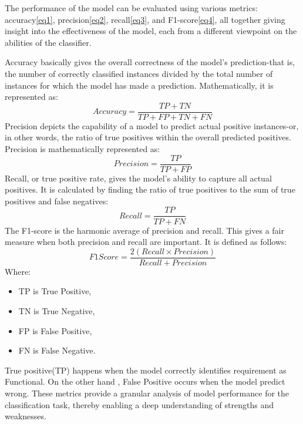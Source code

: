 \documentclass[conference]{IEEEtran} %
\begin{document}
The performance of the model can be evaluated using various metrics: accuracy\ref{eq1}, precision\ref{eq2}, recall\ref{eq3}, and F1-score\ref{eq4}, all together giving insight into the effectiveness of the model, each from a different viewpoint on the abilities of the classifier. 

Accuracy basically gives the overall correctness of the model's prediction-that is, the number of correctly classified instances divided by the total number of instances for which the model has made a prediction. Mathematically, it is represented as: 
\begin{equation}
    Accuracy =\frac{TP+TN}{TP+FP+TN+FN}
    \label{eq1}
\end{equation}
Precision depicts the capability of a model to predict actual positive instances-or, in other words, the ratio of true positives within the overall predicted positives. Precision is mathematically represented as: 
\begin{equation}
    Precision =\frac{TP}{TP+FP}
    \label{eq3}
\end{equation}
Recall, or true positive rate, gives the model's ability to capture all actual positives. It is calculated by finding the ratio of true positives to the sum of true positives and false negatives:  
\begin{equation}
    Recall =\frac{TP}{TP+FN}
    \label{eq2}
\end{equation}
The F1-score is the harmonic average of precision and recall. This gives a fair measure when both precision and recall are important. It is defined as follows:  
\begin{equation}
    F1 Score =\frac{2(Recall \times Precision)}{Recall+Precision}
    \label{eq4}
\end{equation}
Where: 
\begin{itemize}
    \item TP is True Positive,
    \item TN is True Negative,
    \item FP is False Positive,
    \item FN is False Negative.
\end{itemize}
True positive(TP) happens when the model correctly identifies requirement as Functional.
On the other hand , False Positive occurs when the model predict wrong. 
These metrics provide a granular analysis of model performance for the classification task, thereby enabling a deep understanding of strengths and weaknesses.
\end{document}
